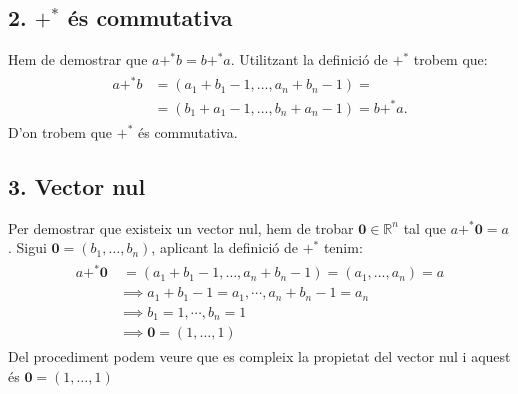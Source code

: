 \documentclass[a4paper, 9pt]{article}
\begin{document}
    \subsection*{2. ${+^*}$ \'es commutativa}
        Hem de demostrar que ${a +^* b = b +^* a}$. Utilitzant la definici\'o de ${+^*}$ trobem que:
        \begin{align*}
            \begin{aligned}
                a +^* b &= (a_1 + b_1 -1, \dots , a_n+b_n-1) =\\
                        &=(b_1+a_1-1, \dots , b_n+a_n-1) = b +^* a.
            \end{aligned}
        \end{align*}
        D'on trobem que ${+^*}$ \'es commutativa.

    \subsection*{3. Vector nul} 
        Per demostrar que existeix un vector nul, hem de trobar ${\mathbf{0} \in \mathbb{R}^n}$ tal que ${a +^* \mathbf{0} = a}$. Sigui ${\mathbf{0} = (b_1,\dots,b_n)}$, aplicant la definici\'o de ${+^*}$ tenim:
        \begin{align*}
            \begin{aligned}
                a +^* \mathbf{0} &\:= (a_1+b_1-1,\dots,a_n+b_n-1) = (a_1,\dots,a_n) = a \\
                                 &\implies  a_1+b_1-1 = a_1, \cdots, a_n+b_n-1 = a_n \\
                                 &\implies b_1 = 1, \cdots , b_n = 1\\
                                 &\implies \mathbf{0} = (1, \dots, 1)
            \end{aligned}
        \end{align*}
        Del procediment podem veure que es compleix la propietat del vector nul i aquest \'es ${\mathbf{0} = (1,\dots,1)}$
        
\end{document}
